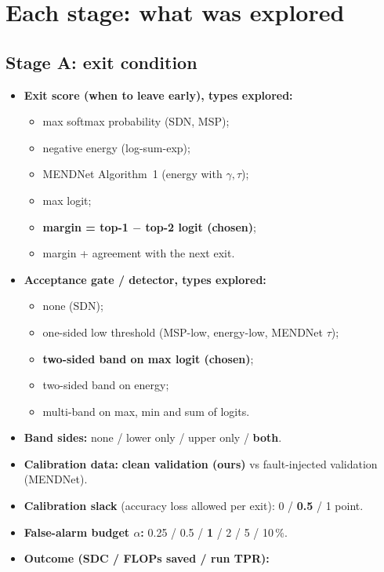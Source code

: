 \documentclass[10pt,a4paper]{article}
\begin{document}
\section{Each stage: what was explored}

\subsection{Stage A: exit condition}

\begin{itemize}
  \item \textbf{Exit score (when to leave early), types explored:}
  \begin{itemize}
    \item max softmax probability (SDN, MSP);
    \item negative energy (log-sum-exp);
    \item MENDNet Algorithm~1 (energy with $\gamma,\tau$);
    \item max logit;
    \item \textbf{margin = top-1 $-$ top-2 logit (chosen)};
    \item margin + agreement with the next exit.
  \end{itemize}
  \item \textbf{Acceptance gate / detector, types explored:}
  \begin{itemize}
    \item none (SDN);
    \item one-sided low threshold (MSP-low, energy-low, MENDNet $\tau$);
    \item \textbf{two-sided band on max logit (chosen)};
    \item two-sided band on energy;
    \item multi-band on max, min and sum of logits.
  \end{itemize}
  \item \textbf{Band sides:} none / lower only / upper only / \textbf{both}.
  \item \textbf{Calibration data:} \textbf{clean validation (ours)} vs fault-injected validation (MENDNet).
  \item \textbf{Calibration slack} (accuracy loss allowed per exit): 0 / \textbf{0.5} / 1 point.
  \item \textbf{False-alarm budget $\alpha$:} 0.25 / 0.5 / \textbf{1} / 2 / 5 / 10\,\%.
  \item \textbf{Outcome (SDC / FLOPs saved / run TPR):}

\end{itemize}
\end{document}
